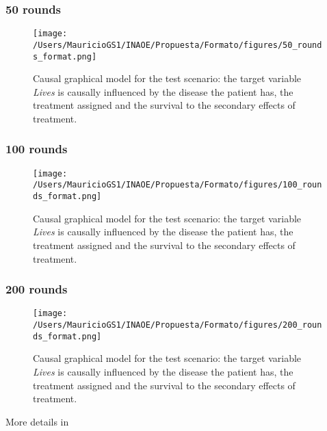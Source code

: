 \documentclass{beamer}
\theoremstyle{plain}
\begin{document}
\begin{frame}
\frametitle{50 rounds}
\begin{figure}[ht]
\vskip 0.2in
\begin{center}
\texttt{[image: /Users/MauricioGS1/INAOE/Propuesta/Formato/figures/50\_rounds\_format.png]}
\caption{Causal graphical model for the test scenario: the target variable \textit{Lives} is causally influenced by the disease the patient has, the treatment assigned and the survival to the secondary effects of treatment.}
\label{causal_model}
\end{center}
\vskip -0.2in
\end{figure}
\end{frame}

\begin{frame}
\frametitle{100 rounds}
\begin{figure}[ht]
\vskip 0.2in
\begin{center}
\texttt{[image: /Users/MauricioGS1/INAOE/Propuesta/Formato/figures/100\_rounds\_format.png]}
\caption{Causal graphical model for the test scenario: the target variable \textit{Lives} is causally influenced by the disease the patient has, the treatment assigned and the survival to the secondary effects of treatment.}
\label{causal_model}
\end{center}
\vskip -0.2in
\end{figure}
\end{frame}

\begin{frame}
\frametitle{200 rounds}
\begin{figure}[ht]
\vskip 0.2in
\begin{center}
\texttt{[image: /Users/MauricioGS1/INAOE/Propuesta/Formato/figures/200\_rounds\_format.png]}
\caption{Causal graphical model for the test scenario: the target variable \textit{Lives} is causally influenced by the disease the patient has, the treatment assigned and the survival to the secondary effects of treatment.}
\label{causal_model}
\end{center}
\vskip -0.2in
\end{figure}
\end{frame}

\begin{frame}
More details in \cite{gonzalez2018playing}
\end{frame}
\end{document}

